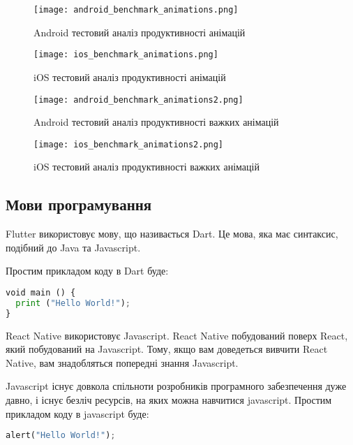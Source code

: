 \begin{figure}
    \texttt{[image: android\_benchmark\_animations.png]}
    \caption{Android тестовий аналіз продуктивності анімацій}
    \label{fig:android_benchmark_animations}
\end{figure}

\begin{figure}
    \texttt{[image: ios\_benchmark\_animations.png]}
    \caption{iOS тестовий аналіз продуктивності анімацій}
    \label{fig:ios_benchmark_animations}
\end{figure}

\begin{figure}
    \texttt{[image: android\_benchmark\_animations2.png]}
    \caption{Android тестовий аналіз продуктивності важких анімацій}
    \label{fig:android_benchmark_animations2}
\end{figure}

\begin{figure}
    \texttt{[image: ios\_benchmark\_animations2.png]}
    \caption{iOS тестовий аналіз продуктивності важких анімацій}
    \label{fig:ios_benchmark_animations2}
\end{figure}

\subsection{Мови програмування}
\label{subsec:languages}

Flutter використовує мову, що називається Dart.
Це мова, яка має синтаксис, подібний до Java та Javascript.

Простим прикладом коду в Dart буде:
\begin{lstlisting}[style=light, language=Python,label={lst:vectorimg},caption=Dart Hello World]
void main () { 
  print ("Hello World!"); 
}
\end{lstlisting}

React Native використовує Javascript.
React Native побудований поверх React, який побудований на Javascript.
Тому, якщо вам доведеться вивчити React Native, вам знадобляться попередні знання Javascript.

Javascript існує довкола спільноти розробників програмного забезпечення дуже давно, і існує безліч ресурсів, на яких можна навчитися javascript.
Простим прикладом коду в javascript буде:

\begin{lstlisting}[style=light, language=Python,label={lst:vectorimg},caption=Dart Hello World]
  alert("Hello World!");
\end{lstlisting}

